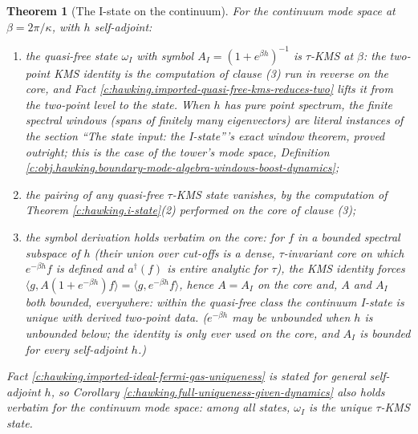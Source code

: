 \documentclass[11pt]{article}
\newtheorem{theorem}{Theorem}[section]
\theoremstyle{definition}
\theoremstyle{plain}
\newcommand{\changedmark}[2]{\marginpar{\raggedright\scriptsize\color{#1}#2}}
\providecommand{\ip}{}\renewcommand{\ip}[2]{\langle #1, #2\rangle}
\begin{document}
\begin{theorem}[The I-state on the continuum]\label{c:hawking.i-state-continuum}
\changedmark{gray}{reworded}
For the continuum mode space at $\beta = 2\pi/\kappa$, with $h$ self-adjoint:
\begin{enumerate}
\item the quasi-free state $\omega_I$ with symbol $A_I = (1 + e^{\beta h})^{-1}$ is $\tau$-KMS at $\beta$: the two-point KMS identity is the computation of clause (3) run in reverse on the core, and Fact \ref{c:hawking.imported-quasi-free-kms-reduces-two} lifts it from the two-point level to the state. When $h$ has pure point spectrum, the finite spectral windows (spans of finitely many eigenvectors) are literal instances of the section ``The state input: the I-state'''s exact window theorem, proved outright; this is the case of the tower's mode space, Definition \ref{c:obj.hawking.boundary-mode-algebra-windows-boost-dynamics};
\item the pairing of any quasi-free $\tau$-KMS state vanishes, by the computation of Theorem \ref{c:hawking.i-state}(2) performed on the core of clause (3);
\item the symbol derivation holds verbatim on the core: for $f$ in a bounded spectral subspace of $h$ (their union over cut-offs is a dense, $\tau$-invariant core on which $e^{-\beta h}f$ is defined and $a^\dagger(f)$ is entire analytic for $\tau$), the KMS identity forces $\ip{g}{A(1 + e^{-\beta h})f} = \ip{g}{e^{-\beta h}f}$, hence $A = A_I$ on the core and, $A$ and $A_I$ both bounded, everywhere: within the quasi-free class the continuum I-state is unique with derived two-point data. ($e^{-\beta h}$ may be unbounded when $h$ is unbounded below; the identity is only ever used on the core, and $A_I$ is bounded for every self-adjoint $h$.)
\end{enumerate}
Fact \ref{c:hawking.imported-ideal-fermi-gas-uniqueness} is stated for general self-adjoint $h$, so Corollary \ref{c:hawking.full-uniqueness-given-dynamics} also holds verbatim for the continuum mode space: among all states, $\omega_I$ is the unique $\tau$-KMS state.
\end{theorem}
\end{document}
